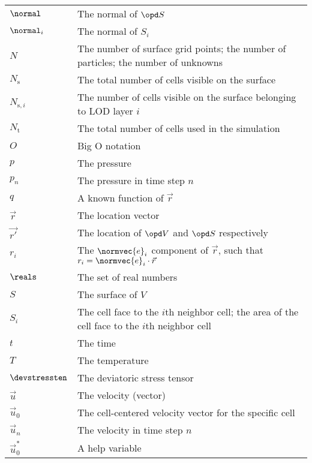 {\begin{center}
\begin{longtabu}{l X}
    $\normal$           & The normal of $\opd S$ \\
    $\normal_i$         & The normal of $S_i$ \\
    $N$                 & The number of surface grid points; the number of particles;
                          the number of unknowns \\
    $N_{\text{s}}$      & The total number of cells visible on the surface \\
    $N_{\text{s},i}$    & The number of cells visible on the surface belonging to LOD layer $i$ \\
    $N_{\text{t}}$      & The total number of cells used in the simulation \\
    $O$                 & Big O notation \\
    $p$                 & The pressure \\
    $p_n$               & The pressure in time step $n$ \\
    $q$                 & A known function of $\vec{r}$ \\
    $\vec{r}$           & The location vector \\
    $\vec{r'}$          & The location of $\opd V$ and $\opd S$ respectively \\
    $r_i$               & The $\normvec{e}_i$ component of $\vec{r}$,
                          such that $r_i = \normvec{e}_i\cdot\vec{r}$ \\
    $\reals$            & The set of real numbers \\
    $S$                 & The surface of $V$ \\
    $S_i$               & The cell face to the $i$th neighbor cell;
                          the area of the cell face to the $i$th neighbor cell \\
    $t$                 & The time \\
    $T$                 & The temperature \\
    $\devstressten$     & The deviatoric stress tensor \\
    $\vec{u}$           & The velocity (vector) \\
    $\vec{u}_0$         & The cell-centered velocity vector for the specific cell \\
    $\vec{u}_n$         & The velocity in time step $n$ \\
    $\vec{u}_0^*$       & A help variable \\

\end{longtabu}
\end{center}}
